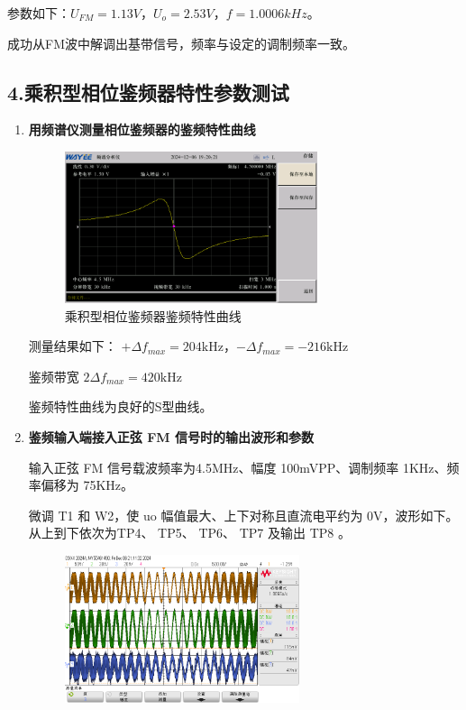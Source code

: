 \documentclass[UTF8]{ctexart}
\begin{document}
\begin{enumerate}[(1)]
    参数如下：$U_{FM}=1.13V$，$U_o=2.53V$，$f=1.0006kHz$。

    成功从FM波中解调出基带信号，频率与设定的调制频率一致。
    
\end{enumerate}

\subsection*{4.乘积型相位鉴频器特性参数测试}
\begin{enumerate}[(1)]
    \item \textbf{用频谱仪测量相位鉴频器的鉴频特性曲线}

    \begin{figure}[H]
        \centering
        
        \includegraphics[width=0.7\textwidth]{pics/40.png}
        \caption{乘积型相位鉴频器鉴频特性曲线}\label{fig:40}
    \end{figure}
    测量结果如下：
    $+\Delta f_{max}=204\mathrm{kHz} $，$-\Delta f_{max}=-216\mathrm{kHz} $

    鉴频带宽 $2\Delta f_{max}=420\mathrm{kHz} $

    鉴频特性曲线为良好的S型曲线。
    
    \item \textbf{鉴频输入端接入正弦 FM 信号时的输出波形和参数}

    输入正弦 FM 信号载波频率为4.5MHz、幅度 100mVPP、调制频率 1KHz、频率偏移为 75KHz。
    
    微调 T1 和 W2，使 uo 幅值最大、上下对称且直流电平约为 0V，波形如下。从上到下依次为TP4、 TP5、 TP6、 TP7 及输出 TP8 。
    \begin{figure}[H]
        \centering
        
        \includegraphics[width=0.65\textwidth]{pics/41.png}
    \end{figure}
    \begin{figure}[H]
        \centering
        

\end{figure}
\end{enumerate}
\end{document}
